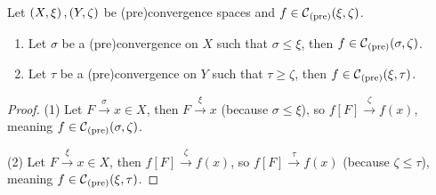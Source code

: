 \begin{lemma} \label{finerCoarserContinuity}
Let $\left( X,\xi \right), \left( Y,\zeta \right)$ be (pre)convergence spaces and $f\in \operatorname{\mathcal{C}}_\text{(pre)}(\xi, \zeta)$.
\begin{enumerate}
\item Let $\sigma$ be a (pre)convergence on $X$ such that $\sigma \leq \xi$, then $f\in \operatorname{\mathcal{C}}_\text{(pre)}(\sigma, \zeta)$.
\item Let $\tau$ be a (pre)convergence on $Y$ such that $\tau \geq \zeta$, then $f\in \operatorname{\mathcal{C}}_\text{(pre)}(\xi, \tau)$.
\end{enumerate}
\end{lemma}
\begin{proof}
(1) Let $F\overset{\sigma}{\longrightarrow} x \in X$, then $F\overset{\xi}{\longrightarrow} x$ (because $\sigma \leq \xi$), so $f[F]\overset{\zeta}{\longrightarrow} f(x)$, meaning $f\in \operatorname{\mathcal{C}}_\text{(pre)}(\sigma, \zeta)$.

(2) Let $F\overset{\xi}{\longrightarrow} x \in X$, then $f[F]\overset{\zeta}{\longrightarrow} f(x)$, so $f[F]\overset{\tau}{\longrightarrow} f(x)$  (because $\zeta \leq \tau$), meaning $f\in \operatorname{\mathcal{C}}_\text{(pre)}(\xi, \tau)$.
\end{proof}

